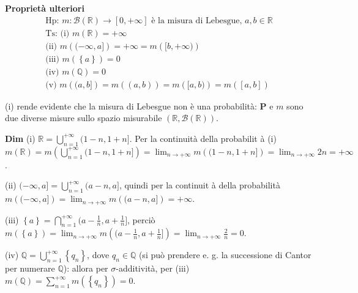 \documentclass{article}
\begin{document}
\textbf{Propriet\`{a} ulteriori}%
\begin{gather*}
\text{Hp}\text{: }m:\mathcal{B}\left( 
\mathbb{R}
\right) \rightarrow \left[ 0,+\infty \right] \text{ \`{e} la misura di
Lebesgue, }a,b\in 
\mathbb{R}
\\
\text{Ts}\text{: (i) }m\left( 
\mathbb{R}
\right) =+\infty \\
\text{(ii) }m\left( (-\infty ,a]\right) =+\infty =m\left( [b,+\infty )\right)
\\
\text{(iii) }m\left( \left\{ a\right\} \right) =0 \\
\text{(iv) }m\left( 
\mathbb{Q}
\right) =0 \\
\text{(v) }m\left( (a,b]\right) =m\left( (a,b)\right) =m\left( [a,b)\right)
=m\left( [a,b]\right)
\end{gather*}

(i) rende evidente che la misura di Lebesgue non \`{e} una probabilit\`{a}: $%
\mathbf{P}$ e $m$ sono due diverse misure sullo spazio misurabile $\left( 
\mathbb{R}
,\mathcal{B}\left( 
\mathbb{R}
\right) \right) $.

\textbf{Dim} (i) $%
\mathbb{R}
=\bigcup_{n=1}^{+\infty }(1-n,1+n]$. Per la continuit\`{a} della probabilit%
\`{a} (i) $m\left( 
\mathbb{R}
\right) =m\left( \bigcup_{n=1}^{+\infty }(1-n,1+n]\right)
=\lim_{n\rightarrow +\infty }m\left( (1-n,1+n]\right) =\lim_{n\rightarrow
+\infty }2n=+\infty $.

(ii) $(-\infty ,a]=\bigcup_{n=1}^{+\infty }(a-n,a]$, quindi per la continuit%
\`{a} della probabilit\`{a} $m\left( (-\infty ,a]\right) =\lim_{n\rightarrow
+\infty }m\left( (a-n,a]\right) =+\infty $.

(iii) $\left\{ a\right\} =\bigcap_{n=1}^{+\infty }(a-\frac{1}{n},a+\frac{1}{n%
}]$, perci\`{o} $m\left( \left\{ a\right\} \right) =\lim_{n\rightarrow
+\infty }m\left( (a-\frac{1}{n},a+\frac{1}{n}]\right) =\lim_{n\rightarrow
+\infty }\frac{2}{n}=0$.

(iv) $%
\mathbb{Q}
=\bigcup_{n=1}^{+\infty }\left\{ q_{n}\right\} $, dove $q_{n}\in 
\mathbb{Q}
$ (si pu\`{o} prendere e. g. la successione di Cantor per numerare $%
\mathbb{Q}
$): allora per $\sigma $-additivit\`{a}, per (iii) $m\left( 
\mathbb{Q}
\right) =\sum_{n=1}^{+\infty }m\left( \left\{ q_{n}\right\} \right) =0$.
\end{document}
